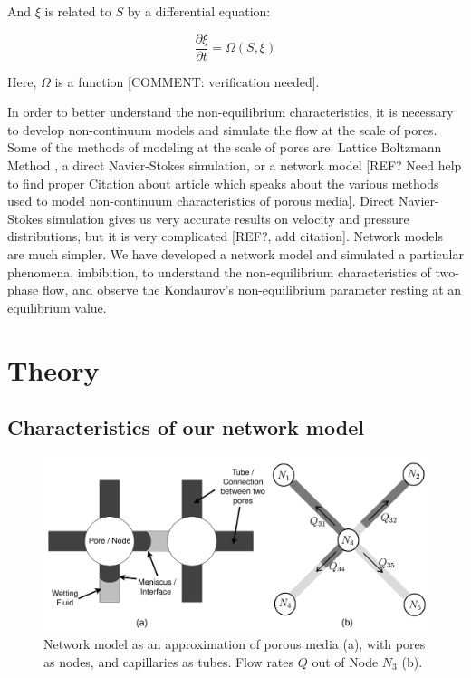 \documentclass[
	12pt
] {article}
\begin{document}
	And $\xi$ is related to $S$ by a differential equation:
	
	\begin{equation}
		\frac{\partial \xi}{\partial t} = \Omega ( S, \xi )
	\end{equation}
		
	Here, $\Omega$ is a function [COMMENT: verification needed].
	
	In order to better understand the non-equilibrium characteristics, it is necessary to develop non-continuum models and simulate the flow at the scale of pores. Some of the methods of modeling at the scale of pores are: Lattice Boltzmann Method \cite{chen1998lattice}, a direct Navier-Stokes simulation, or a network model [REF? Need help to find proper Citation about article which speaks about the various methods used to model non-continuum characteristics of porous media]. Direct Navier-Stokes simulation gives us very accurate results on velocity and pressure distributions, but it is very complicated [REF?, add citation]. Network models are much simpler. We have developed a network model and simulated a particular phenomena, imbibition, to understand the non-equilibrium characteristics of two-phase flow, and observe the Kondaurov's non-equilibrium parameter resting at an equilibrium value.
	
\section{Theory}
\subsection{Characteristics of our network model}
	\begin{figure}
		\centering
		\includegraphics[width=\textwidth]{fig_1_2200x1000}
		\caption{Network model as an approximation of porous media (a), with pores as nodes, and capillaries as tubes. Flow rates $Q$ out of Node $N_3$ (b).}
		\label{fig:1}
	\end{figure}
	
\end{document}
